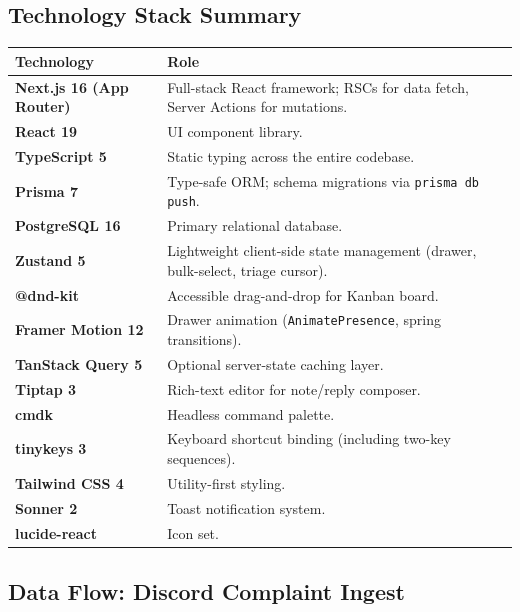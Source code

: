 \documentclass[12pt,a4paper]{report}
\begin{document}
\subsection{Technology Stack Summary}

\begin{longtable}{>{\bfseries}p{3.5cm} p{9cm}}
\toprule
Technology & Role \\
\midrule
\endhead
Next.js 16 (App Router) & Full-stack React framework; RSCs for data fetch, Server Actions for mutations. \\
React 19 & UI component library. \\
TypeScript 5 & Static typing across the entire codebase. \\
Prisma 7 & Type-safe ORM; schema migrations via \texttt{prisma db push}. \\
PostgreSQL 16 & Primary relational database. \\
Zustand 5 & Lightweight client-side state management (drawer, bulk-select, triage cursor). \\
@dnd-kit & Accessible drag-and-drop for Kanban board. \\
Framer Motion 12 & Drawer animation (\texttt{AnimatePresence}, spring transitions). \\
TanStack Query 5 & Optional server-state caching layer. \\
Tiptap 3 & Rich-text editor for note/reply composer. \\
cmdk & Headless command palette. \\
tinykeys 3 & Keyboard shortcut binding (including two-key sequences). \\
Tailwind CSS 4 & Utility-first styling. \\
Sonner 2 & Toast notification system. \\
lucide-react & Icon set. \\
\bottomrule
\end{longtable}

\subsection{Data Flow: Discord Complaint Ingest}
\end{document}
